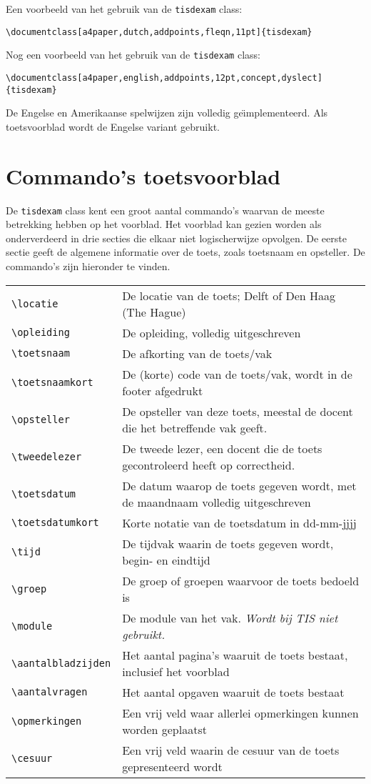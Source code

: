 \documentclass[dutch,a4paper,12pt,addpoints,fleqn,oneside]{tisdexam}
\newcommand\DocClass[1]{\texttt{#1}}
\begin{document}
\bigskip
Een voorbeeld van het gebruik van de \DocClass{tisdexam} class:
\bigskip

\verb|\documentclass[a4paper,dutch,addpoints,fleqn,11pt]{tisdexam}|
\bigskip

Nog een voorbeeld van het gebruik van de \DocClass{tisdexam} class:
\bigskip

\verb|\documentclass[a4paper,english,addpoints,12pt,concept,dyslect]{tisdexam}|
\bigskip

De Engelse en Amerikaanse spelwijzen zijn volledig
ge\"{\i}mplementeerd. Als toetsvoorblad wordt de Engelse variant gebruikt.


\section{Commando's toetsvoorblad}
\label{sec:commands}

De \DocClass{tisdexam} class kent een groot aantal commando's waarvan de meeste
betrekking hebben op het voorblad.  Het voorblad kan gezien worden als onderverdeerd
in drie secties die elkaar niet logischerwijze opvolgen. De eerste sectie geeft de
algemene informatie over de toets, zoals
toetsnaam en opsteller. De commando's zijn hieronder te vinden.
\bigskip

\begin{tabular}{lp{11cm}}
\verb|\locatie| & De locatie van de toets; Delft of Den Haag (The Hague) \\
\verb|\opleiding| & De opleiding, volledig uitgeschreven\\ 
\verb|\toetsnaam| & De afkorting van de toets/vak \\
\verb|\toetsnaamkort| & De (korte) code van de toets/vak, wordt in de footer afgedrukt \\ 
\verb|\opsteller| & De opsteller van deze toets, meestal de docent die het betreffende vak geeft. \\
\verb|\tweedelezer| & De tweede lezer, een docent die de toets gecontroleerd heeft op correctheid. \\
\verb|\toetsdatum| & De datum waarop de toets gegeven wordt, met de maandnaam volledig uitgeschreven \\ 
\verb|\toetsdatumkort| & Korte notatie van de toetsdatum in dd-mm-jjjj \\
\verb|\tijd|       & De tijdvak waarin de toets gegeven wordt, begin- en eindtijd \\
\verb|\groep|     & De groep of groepen waarvoor de toets bedoeld is \\ 
\verb|\module|    & De module van het vak. \textsl{Wordt bij TIS niet gebruikt.}\\
\verb|\aantalbladzijden| & Het aantal pagina's waaruit de toets bestaat, inclusief het voorblad \\
\verb|\aantalvragen| & Het aantal opgaven waaruit de toets bestaat \\
\verb|\opmerkingen| & Een vrij veld waar allerlei opmerkingen kunnen worden geplaatst \\
\verb|\cesuur| & Een vrij veld waarin de cesuur van de toets gepresenteerd wordt \\
\end{tabular}
\end{document}
